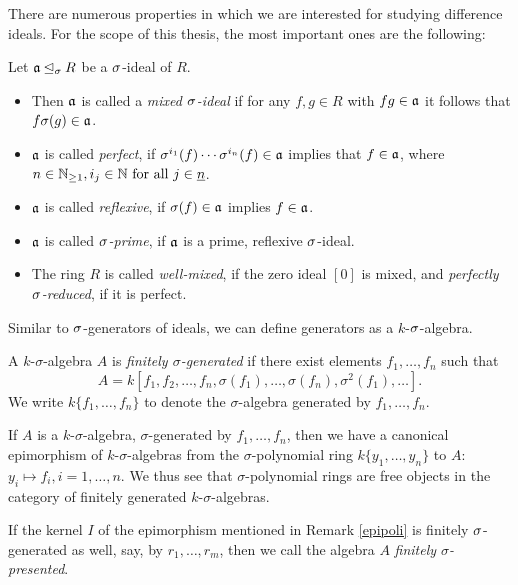 \indent There are numerous properties in which we are interested for studying difference ideals. For the scope of this thesis, the most important ones are the following:
\begin{defn}\label{idealprops}
Let  $\mathfrak{a} \unlhd_{\sigma} R$ be a $\sigma$-ideal of $R$. 
\begin{itemize}
\item Then $\mathfrak{a}$ is called a \emph{mixed $\sigma$-ideal} if for any $f,g \in R$ with $fg \in \mathfrak{a}$ it follows that $f \sigma(g) \in \mathfrak{a}$. 
\item $\mathfrak{a}$ is called \emph{perfect}, if $\sigma^{i_1}(f) \cdots \sigma^{i_n}(f) \in \mathfrak{a}$ implies that $f \in \mathfrak{a}$, where $n \in \mathbb{N}_{\geq1}, i_j \in \mathbb{N} \text{ for all } j \in \underline{n}$. 
\item $\mathfrak{a}$ is called \emph{reflexive}, if $\sigma(f) \in \mathfrak{a}$ implies $f \in \mathfrak{a}$. 
\item $\mathfrak{a}$ is called \emph{$\sigma$-prime}, if $\mathfrak{a}$ is a prime, reflexive $\sigma$-ideal. 
\item The ring $R$ is called \emph{well-mixed}, if the zero ideal $[0]$ is mixed, and \emph{perfectly $\sigma$-reduced}, if it is perfect. 
\end{itemize}
\end{defn}

Similar to $\sigma$-generators of ideals, we can define generators as a $k$-$\sigma$-algebra.

\begin{defn}
A $k$-$\sigma$-algebra  $A$ is \emph{finitely $\sigma$-generated} if there exist elements $f_1, \ldots, f_n$ such that $$A = k[f_1,f_2,\ldots,f_n,\sigma(f_1),\ldots,\sigma(f_n),\sigma^2(f_1),\ldots].$$
We write  $k\{f_1, \ldots, f_n\}$ to denote the  $\sigma$-algebra generated by $f_1, \ldots, f_n$.
\end{defn}

\begin{rem}\label{epipoli}
If $A$ is a $k$-$\sigma$-algebra, $\sigma$-generated by $f_1, \ldots, f_n$, then we have a canonical epimorphism of $k$-$\sigma$-algebras from the $\sigma$-polynomial ring $k\{y_1, \ldots, y_n \}$ to $A$: $y_i \mapsto f_i, i = 1, \ldots, n$. We thus see that $\sigma$-polynomial rings are free objects in the category of finitely generated $k$-$\sigma$-algebras. 
\end{rem}

\begin{defn}
If the kernel $I$ of the epimorphism mentioned in Remark \ref{epipoli} is finitely $\sigma$-generated as well, say, by $r_1, \ldots, r_m$, then we call the algebra $A$ \emph{finitely $\sigma$-presented}. 
\end{defn}

